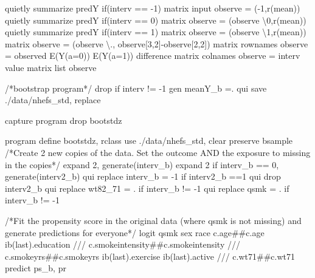 \documentclass[
  10pt,
  a4paper,
]{book}
\newenvironment{Shaded}{\begin{snugshade}}{\end{snugshade}}
\newcommand{\CommentTok}[1]{\textcolor[rgb]{0.37,0.37,0.37}{#1}}
\newcommand{\FunctionTok}[1]{\textcolor[rgb]{0.28,0.35,0.67}{#1}}
\newcommand{\KeywordTok}[1]{\textcolor[rgb]{0.00,0.46,0.62}{#1}}
\newcommand{\NormalTok}[1]{\textcolor[rgb]{0.00,0.46,0.62}{#1}}
\newcommand{\OtherTok}[1]{\textcolor[rgb]{0.00,0.46,0.62}{#1}}
\begin{document}
\begin{Shaded}
\begin{Highlighting}[]
\KeywordTok{quietly} \KeywordTok{summarize}\NormalTok{ predY }\KeywordTok{if}\NormalTok{(interv == {-}1)}
\FunctionTok{matrix}\NormalTok{ input observe = ({-}1,}\OtherTok{\textasciigrave{}r(mean)\textquotesingle{}}\NormalTok{)}
\KeywordTok{quietly} \KeywordTok{summarize}\NormalTok{ predY }\KeywordTok{if}\NormalTok{(interv == 0)}
\FunctionTok{matrix}\NormalTok{ observe = (observe \textbackslash{}0,}\OtherTok{\textasciigrave{}r(mean)\textquotesingle{}}\NormalTok{)}
\KeywordTok{quietly} \KeywordTok{summarize}\NormalTok{ predY }\KeywordTok{if}\NormalTok{(interv == 1)}
\FunctionTok{matrix}\NormalTok{ observe = (observe \textbackslash{}1,}\OtherTok{\textasciigrave{}r(mean)\textquotesingle{}}\NormalTok{)}
\FunctionTok{matrix}\NormalTok{ observe = (observe \textbackslash{}., observe[3,2]{-}observe[2,2]) }
\FunctionTok{matrix} \OtherTok{rownames}\NormalTok{ observe = observed E(Y(a=0)) E(Y(a=1)) difference}
\FunctionTok{matrix} \OtherTok{colnames}\NormalTok{ observe = interv }\OtherTok{value}
\FunctionTok{matrix} \OtherTok{list}\NormalTok{ observe }

\CommentTok{/*bootstrap program*/}
\KeywordTok{drop} \KeywordTok{if}\NormalTok{ interv != {-}1}
\KeywordTok{gen}\NormalTok{ meanY\_b =.}
\KeywordTok{qui} \KeywordTok{save}\NormalTok{ ./}\KeywordTok{data}\NormalTok{/nhefs\_std, }\KeywordTok{replace}

\KeywordTok{capture} \KeywordTok{program} \KeywordTok{drop}\NormalTok{ bootstdz}

\KeywordTok{program} \KeywordTok{define}\NormalTok{ bootstdz, rclass}
\KeywordTok{use}\NormalTok{ ./}\KeywordTok{data}\NormalTok{/nhefs\_std, }\KeywordTok{clear}
\KeywordTok{preserve}
\KeywordTok{bsample} 
\CommentTok{/*Create 2 new copies of the data. }
\CommentTok{Set the outcome AND the exposure to missing in the copies*/}
\NormalTok{expand 2, }\KeywordTok{generate}\NormalTok{(interv\_b)}
\NormalTok{expand 2 }\KeywordTok{if}\NormalTok{ interv\_b == 0, }\KeywordTok{generate}\NormalTok{(interv2\_b)}
\KeywordTok{qui} \KeywordTok{replace}\NormalTok{ interv\_b = {-}1 }\KeywordTok{if}\NormalTok{ interv2\_b ==1}
\KeywordTok{qui} \KeywordTok{drop}\NormalTok{ interv2\_b}
\KeywordTok{qui} \KeywordTok{replace}\NormalTok{ wt82\_71 = . }\KeywordTok{if}\NormalTok{ interv\_b != {-}1}
\KeywordTok{qui} \KeywordTok{replace}\NormalTok{ qsmk = . }\KeywordTok{if}\NormalTok{ interv\_b != {-}1}

\CommentTok{/*Fit the propensity score in the original data }
\CommentTok{(where qsmk is not missing) and generate predictions for everyone*/}
\KeywordTok{logit}\NormalTok{ qsmk sex race c.age\#\#c.age ib(}\FunctionTok{last}\NormalTok{).education }\CommentTok{///}
\NormalTok{  c.smokeintensity\#\#c.smokeintensity }\CommentTok{///}
\NormalTok{    c.smokeyrs\#\#c.smokeyrs ib(}\FunctionTok{last}\NormalTok{).exercise ib(}\FunctionTok{last}\NormalTok{).active }\CommentTok{///}
\NormalTok{    c.wt71\#\#c.wt71 }
\KeywordTok{predict}\NormalTok{ ps\_b, pr}


\end{Highlighting}
\end{Shaded}
\end{document}
